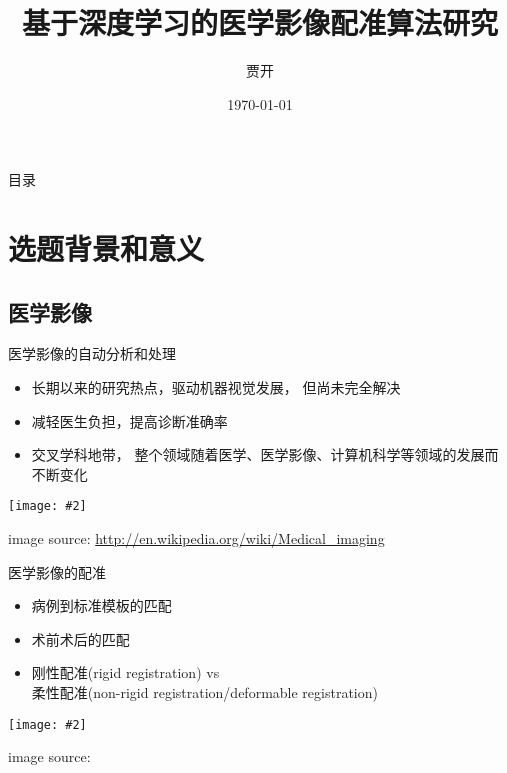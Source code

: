 \documentclass {beamer}
\title{基于深度学习的医学影像配准算法研究}
\author {贾开}
\institute {清华大学}
\date{\today}
\newcommand{\addgraph}[2]{\begin{center}
\texttt{[image: \#2]}\end{center}}
\begin{document}



\begin{frame}{目录}
    \tableofcontents
\end{frame}

\section{选题背景和意义}

\subsection{医学影像}

\begin{frame}{医学影像的自动分析和处理}
    \begin{itemize}
        \item 长期以来的研究热点，驱动机器视觉发展，
            但尚未完全解决
        \item 减轻医生负担，提高诊断准确率
        \item 交叉学科地带，
            整个领域随着医学、医学影像、计算机科学等领域的发展而不断变化
    \end{itemize}
    \addgraph{0.3}{res/mi-concept.jpg}
    \tiny{image source:
        \url{http://en.wikipedia.org/wiki/Medical\_imaging}}
\end{frame}


\begin{frame}{医学影像的配准}
    \begin{itemize}
        \item 病例到标准模板的匹配
        \item 术前术后的匹配
        \item 刚性配准(rigid registration) vs \\
            柔性配准(non-rigid
            registration/deformable registration)
    \end{itemize}
    \addgraph{0.5}{res/example-brain.png}
    \tiny{image source: \cite{shen2007image}}
\end{frame}
\end{document}
